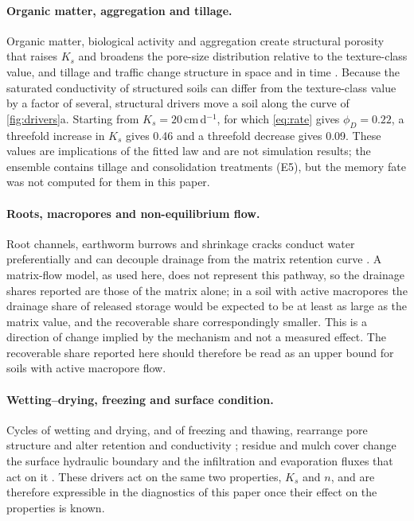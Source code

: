 \paragraph{Organic matter, aggregation and tillage.} Organic matter, biological activity and aggregation create structural porosity that raises $K_s$ and broadens the pore-size distribution relative to the texture-class value, and tillage and traffic change structure in space and in time \citep{Hillel1998,Brady2016,Strudley2008}. Because the saturated conductivity of structured soils can differ from the texture-class value by a factor of several, structural drivers move a soil along the curve of \cref{fig:drivers}a. Starting from $K_s=20$\,cm\,d$^{-1}$, for which \cref{eq:rate} gives $\phi_D=0.22$, a threefold increase in $K_s$ gives 0.46 and a threefold decrease gives 0.09. These values are implications of the fitted law and are not simulation results; the ensemble contains tillage and consolidation treatments (E5), but the memory fate was not computed for them in this paper.

\paragraph{Roots, macropores and non-equilibrium flow.} Root channels, earthworm burrows and shrinkage cracks conduct water preferentially and can decouple drainage from the matrix retention curve \citep{Jarvis2007,Beven1982}. A matrix-flow model, as used here, does not represent this pathway, so the drainage shares reported are those of the matrix alone; in a soil with active macropores the drainage share of released storage would be expected to be at least as large as the matrix value, and the recoverable share correspondingly smaller. This is a direction of change implied by the mechanism and not a measured effect. The recoverable share reported here should therefore be read as an upper bound for soils with active macropore flow.

\paragraph{Wetting--drying, freezing and surface condition.} Cycles of wetting and drying, and of freezing and thawing, rearrange pore structure and alter retention and conductivity \citep{Leuther2021}; residue and mulch cover change the surface hydraulic boundary and the infiltration and evaporation fluxes that act on it \citep{Leuther2026,Vuaille2024}. These drivers act on the same two properties, $K_s$ and $n$, and are therefore expressible in the diagnostics of this paper once their effect on the properties is known.

